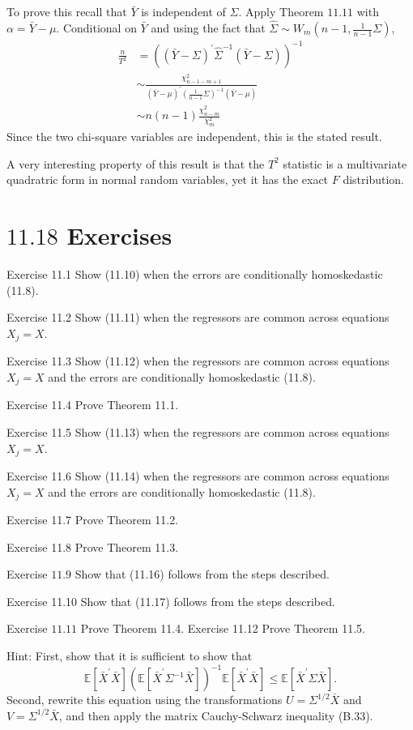 \documentclass[10pt]{article}
\begin{document}
To prove this recall that $\bar{Y}$ is independent of $\widehat{\Sigma}$. Apply Theorem $11.11$ with $\alpha=\bar{Y}-\mu$. Conditional on $\bar{Y}$ and using the fact that $\widehat{\Sigma} \sim W_{m}\left(n-1, \frac{1}{n-1} \Sigma\right)$,
$$
\begin{aligned}
\frac{n}{T^{2}} &=\left((\bar{Y}-\Sigma)^{\prime} \widehat{\Sigma}^{-1}(\bar{Y}-\Sigma)\right)^{-1} \\
& \sim \frac{\chi_{n-1-m+1}^{2}}{(\bar{Y}-\mu)^{\prime}\left(\frac{1}{n-1} \Sigma\right)^{-1}(\bar{Y}-\mu)} \\
& \sim n(n-1) \frac{\chi_{n-m}^{2}}{\chi_{m}^{2}}
\end{aligned}
$$
Since the two chi-square variables are independent, this is the stated result.

A very interesting property of this result is that the $T^{2}$ statistic is a multivariate quadratric form in normal random variables, yet it has the exact $F$ distribution.

\section{$11.18$ Exercises}
Exercise 11.1 Show (11.10) when the errors are conditionally homoskedastic (11.8).

Exercise 11.2 Show (11.11) when the regressors are common across equations $X_{j}=X$.

Exercise 11.3 Show (11.12) when the regressors are common across equations $X_{j}=X$ and the errors are conditionally homoskedastic (11.8).

Exercise 11.4 Prove Theorem 11.1.

Exercise 11.5 Show (11.13) when the regressors are common across equations $X_{j}=X$.

Exercise 11.6 Show (11.14) when the regressors are common across equations $X_{j}=X$ and the errors are conditionally homoskedastic (11.8).

Exercise 11.7 Prove Theorem 11.2.

Exercise 11.8 Prove Theorem 11.3.

Exercise $11.9$ Show that (11.16) follows from the steps described.

Exercise 11.10 Show that (11.17) follows from the steps described.

Exercise $11.11$ Prove Theorem 11.4. Exercise 11.12 Prove Theorem 11.5.

Hint: First, show that it is sufficient to show that
$$
\mathbb{E}\left[\bar{X}^{\prime} \bar{X}\right]\left(\mathbb{E}\left[\bar{X}^{\prime} \Sigma^{-1} \bar{X}\right]\right)^{-1} \mathbb{E}\left[\bar{X}^{\prime} \bar{X}\right] \leq \mathbb{E}\left[\bar{X}^{\prime} \Sigma \bar{X}\right] .
$$
Second, rewrite this equation using the transformations $U=\Sigma^{1 / 2} \bar{X}$ and $V=\Sigma^{1 / 2} \bar{X}$, and then apply the matrix Cauchy-Schwarz inequality (B.33).
\end{document}
